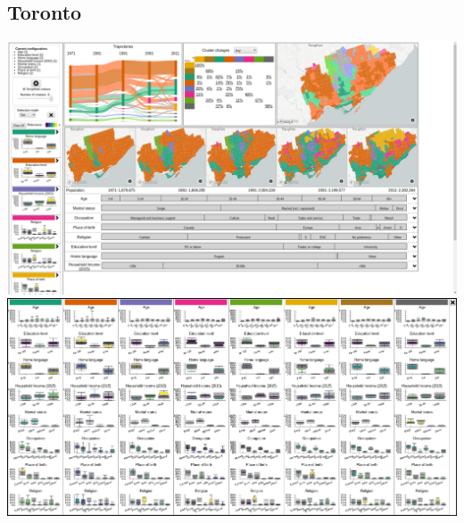 \documentclass[a4paper]{article}
\begin{document}
\subsection{Toronto}
\begin{center}
    \includegraphics[width=\linewidth]{40a.png}
    \includegraphics[width=\linewidth]{40b.png}
\end{center}
\end{document}
